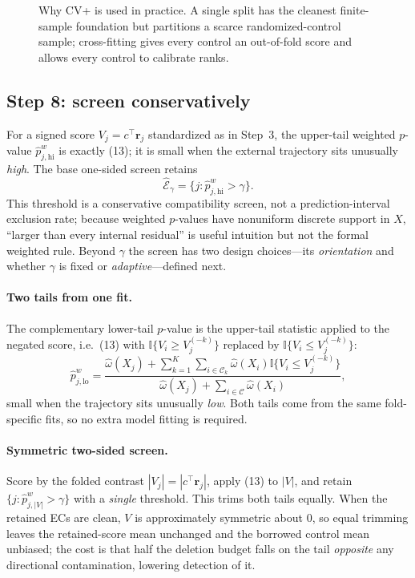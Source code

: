 \documentclass[11pt]{article}
\newcommand{\ind}{\mathbb{I}}
\newcommand{\fullfig}[1]{\resizebox{\linewidth}{!}{}}
\begin{document}
\begin{figure}[!ht]
\centering
\fullfig{split_vs_cv.tex}
\caption{Why CV+ is used in practice. A single split has the cleanest finite-sample foundation but partitions a scarce randomized-control sample; cross-fitting gives every control an out-of-fold score and allows every control to calibrate ranks.}
\label{fig:split-vs-cv}
\end{figure}

\subsection{Step 8: screen conservatively}\label{sec:screen}

For a signed score $V_j=c^{\top}\bm r_j$ standardized as in Step~3, the upper-tail weighted $p$-value $\widehat p_{j,\mathrm{hi}}^{w}$ is exactly (13); it is small when the external trajectory sits unusually \emph{high}. The base one-sided screen retains
\[
\widehat{\mathcal E}_{\gamma}
=
\{j:\widehat p_{j,\mathrm{hi}}^{w}>\gamma\}.
\tag{14}
\]
This threshold is a conservative compatibility screen, not a prediction-interval exclusion rate; because weighted $p$-values have nonuniform discrete support in $X$, ``larger than every internal residual'' is useful intuition but not the formal weighted rule. Beyond $\gamma$ the screen has two design choices---its \emph{orientation} and whether $\gamma$ is fixed or \emph{adaptive}---defined next.

\paragraph{Two tails from one fit.} The complementary lower-tail $p$-value is the upper-tail statistic applied to the negated score, i.e.\ (13) with $\ind\{V_i\ge V_j^{(-k)}\}$ replaced by $\ind\{V_i\le V_j^{(-k)}\}$:
\[
\widehat p_{j,\mathrm{lo}}^{w}
=
\frac{\widehat\omega(X_j)+\sum_{k=1}^{K}\sum_{i\in\mathcal C_k}\widehat\omega(X_i)\ind\{V_i\le V_j^{(-k)}\}}
{\widehat\omega(X_j)+\sum_{i\in\mathcal C}\widehat\omega(X_i)},
\]
small when the trajectory sits unusually \emph{low}. Both tails come from the same fold-specific fits, so no extra model fitting is required.

\paragraph{Symmetric two-sided screen.} Score by the folded contrast $|V_j|=|c^{\top}\bm r_j|$, apply (13) to $|V|$, and retain $\{j:\widehat p_{j,|V|}^{w}>\gamma\}$ with a \emph{single} threshold. This trims both tails equally. When the retained ECs are clean, $V$ is approximately symmetric about $0$, so equal trimming leaves the retained-score mean unchanged and the borrowed control mean unbiased; the cost is that half the deletion budget falls on the tail \emph{opposite} any directional contamination, lowering detection of it.
\end{document}
